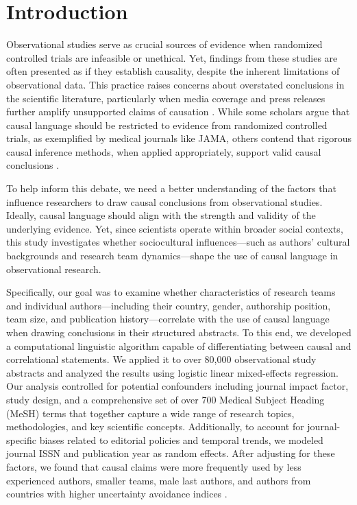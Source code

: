 \section{Introduction}

Observational studies serve as crucial sources of evidence when randomized
controlled trials are infeasible or unethical.
Yet, findings from these studies are often presented as if they establish
causality, despite the inherent limitations of observational data.
This practice raises concerns about overstated conclusions in the scientific
literature, particularly when media coverage and press releases further amplify unsupported claims of causation
\cite{cofield2010use,sumner2014association}.
While some scholars argue that causal language should be restricted to evidence
from randomized controlled trials, as exemplified by medical journals like JAMA, others
contend that rigorous causal inference methods, when applied appropriately,
support valid causal conclusions \cite{pearl2018book,hernan2018c,dahabreh2024causal}.


To help inform this debate, we need a better understanding of the factors that
influence researchers to draw causal conclusions from observational studies.
Ideally, causal language should align with the strength and validity of the
underlying evidence. Yet, since scientists operate within broader social
contexts, this study investigates whether sociocultural influences---such as
authors’ cultural backgrounds and research team dynamics---shape the use of
causal language in observational research.


Specifically, our goal was to examine whether characteristics of research teams and 
individual authors---including their country, gender, authorship position, team size, and
publication history---correlate with the use of causal language when drawing conclusions
in their structured abstracts.
To this end, we developed a
computational linguistic algorithm capable of differentiating between causal and
correlational statements. We applied it to over
80,000 observational study abstracts and analyzed the results using logistic
linear mixed-effects regression.
Our analysis controlled for potential confounders
including journal impact factor, study design, and 
a comprehensive set of over 700 Medical Subject Heading (MeSH) terms that
together capture a wide range of research topics, methodologies,
and key scientific concepts.
Additionally, to account for journal-specific biases related to
editorial policies and temporal trends, we modeled journal ISSN and publication
year as random effects. After adjusting for these factors, we found that causal
claims were more frequently used by less experienced authors, smaller teams,
male last authors, and authors from countries with higher uncertainty avoidance
indices \cite{hofstede2010}.